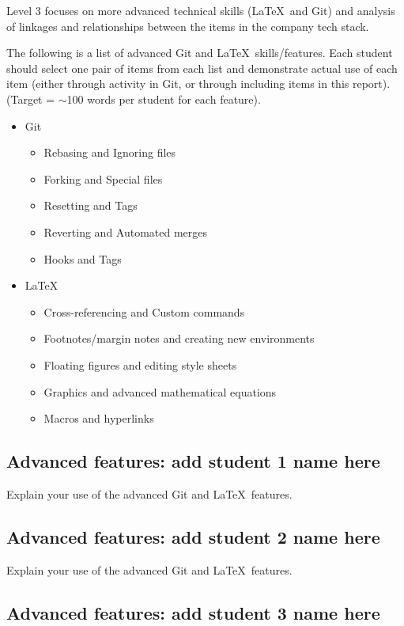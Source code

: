 \documentclass[a4paper, 11pt]{report}
\begin{document}
Level 3 focuses on more advanced technical skills (\LaTeX\ and Git) and analysis of linkages and relationships between the items in the company tech stack.

The following is a list of advanced Git and \LaTeX\ skills/features. Each student should select one pair of items from each list and demonstrate actual use of each item (either through activity in Git, or through including items in this report). (Target = $\sim$100 words per student for each feature).
\begin{itemize}
    \item Git
    \begin{itemize}
        \item Rebasing and Ignoring files
        \item Forking and Special files
        \item Resetting and Tags
        \item Reverting and Automated merges
        \item Hooks and Tags
    \end{itemize}
    \item \LaTeX\ 
    \begin{itemize}
        \item Cross-referencing and Custom commands
        \item Footnotes/margin notes and creating new environments
        \item Floating figures and editing style sheets
        \item Graphics and advanced mathematical equations
        \item Macros and hyperlinks
    \end{itemize}
\end{itemize}

\subsection{Advanced features: add student 1 name here}

Explain your use of the advanced Git and \LaTeX\ features. 

\subsection{Advanced features: add student 2 name here}

Explain your use of the advanced Git and \LaTeX\ features. 

\subsection{Advanced features: add student 3 name here}
\end{document}
